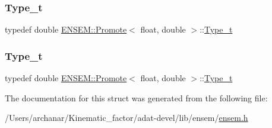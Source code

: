 \mbox{\label{structENSEM_1_1Promote_3_01float_00_01double_01_4_a09b7701594759488b49b335572cbfb62}} 
\subsubsection{\texorpdfstring{Type\_t}{Type\_t}\hspace{0.1cm}{\footnotesize\ttfamily [2/3]}}
{\footnotesize\ttfamily typedef double \mbox{\hyperlink{structENSEM_1_1Promote}{E\+N\+S\+E\+M\+::\+Promote}}$<$ float, double $>$\+::\mbox{\hyperlink{structENSEM_1_1Promote_3_01float_00_01double_01_4_a09b7701594759488b49b335572cbfb62}{Type\+\_\+t}}}

\mbox{\label{structENSEM_1_1Promote_3_01float_00_01double_01_4_a09b7701594759488b49b335572cbfb62}} 
\subsubsection{\texorpdfstring{Type\_t}{Type\_t}\hspace{0.1cm}{\footnotesize\ttfamily [3/3]}}
{\footnotesize\ttfamily typedef double \mbox{\hyperlink{structENSEM_1_1Promote}{E\+N\+S\+E\+M\+::\+Promote}}$<$ float, double $>$\+::\mbox{\hyperlink{structENSEM_1_1Promote_3_01float_00_01double_01_4_a09b7701594759488b49b335572cbfb62}{Type\+\_\+t}}}



The documentation for this struct was generated from the following file\+:\begin{DoxyCompactItemize}
\item 
/\+Users/archanar/\+Kinematic\+\_\+factor/adat-\/devel/lib/ensem/\mbox{\hyperlink{adat-devel_2lib_2ensem_2ensem_8h}{ensem.\+h}}\end{DoxyCompactItemize}
